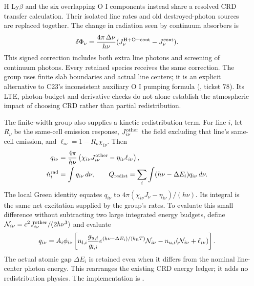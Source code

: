 \documentclass[10pt,a4paper]{article}
\begin{document}
H Ly$\beta$ and the six overlapping O I components instead share a resolved
CRD transfer calculation. Their isolated line rates and old destroyed-photon
sources are replaced together. The change in radiation seen by continuum
absorbers is
\begin{equation}
 \delta\Phi_\nu=\frac{4\pi\,\Delta\nu}{h\nu}
 (J_\nu^{\rm H+O+cont}-J_\nu^{\rm cont}).\label{eq:overlap}
\end{equation}
This signed correction includes both extra line photons and screening of
continuum photons. Every retained species receives the same correction.
The group uses finite slab boundaries and actual line centers; it is an
explicit alternative to C23's inconsistent auxiliary O I pumping formula
(, ticket 78).
Its LTE, photon-budget and derivative checks do not alone establish
the atmospheric impact of choosing CRD rather than partial redistribution.

The finite-width group also supplies a kinetic redistribution term. For
line $i$, let $R_\nu$ be the same-cell emission response,
$J_{i\nu}^{\rm other}$ the field excluding that line's same-cell emission,
and $\ell_{i\nu}=1-R_\nu\chi_{i\nu}$. Then
\begin{equation}
 \begin{aligned}
 q_{i\nu}&=\frac{4\pi}{h\nu}
  \left(\chi_{i\nu}J_{i\nu}^{\rm other}-\eta_{i\nu}\ell_{i\nu}\right),\\
 \dot n_i^{\rm rad}&=\int q_{i\nu}\,d\nu,\qquad
 Q_{\rm redist}=\sum_i\int(h\nu-\Delta E_i)q_{i\nu}\,d\nu.
 \end{aligned}
 \label{eq:line_redistribution}
\end{equation}
The local Green identity equates $q_{i\nu}$ to
$4\pi(\chi_{i\nu}J_\nu-\eta_{i\nu})/(h\nu)$. Its integral is the same
net excitation supplied by the group's rates. To evaluate this small
difference without subtracting two large integrated energy budgets, define
$\mathcal N_{i\nu}=c^2J_{i\nu}^{\rm other}/(2h\nu^3)$ and evaluate
\begin{equation}
 q_{i\nu}=A_i\phi_{i\nu}
 \left[n_{l,i}\frac{g_{u,i}}{g_{l,i}}
 e^{(h\nu-\Delta E_i)/(k_{\rm B}T)}\mathcal N_{i\nu}
 -n_{u,i}(\mathcal N_{i\nu}+\ell_{i\nu})\right].
 \label{eq:line_event_density}
\end{equation}
The actual atomic gap $\Delta E_i$ is retained even when it differs from
the nominal line-center photon energy. This rearranges the existing CRD
energy ledger; it adds no redistribution physics. The implementation is
.
\end{document}

